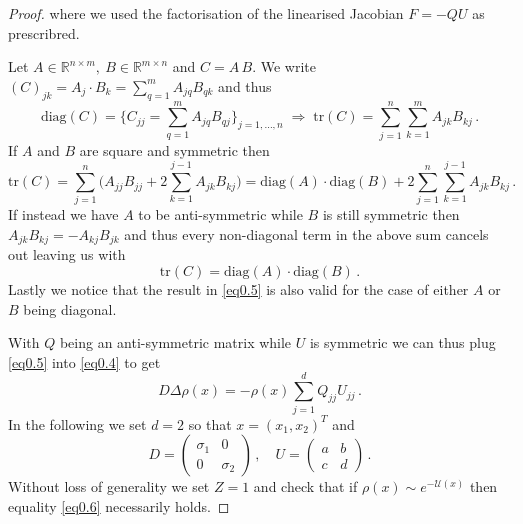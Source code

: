 \documentclass[../main.tex]{subfiles}
\begin{document}
\begin{proof}
          where we used the factorisation of the linearised Jacobian $F=-QU$ as prescribred.
     \begin{interpretation*}{}
          Let $A\in \mathbb{R}^{n\times m},\:B\in \mathbb{R}^{m\times n}$ and $C=A\,B$. We write $(C)_{jk}=A_{j}\cdot B_{k}=\sum_{q=1}^{m}A_{jq}B_{qk}$ and thus
          \begin{equation*}
                  \text{diag}(C)=\{C_{jj}=\sum_{q=1}^{m}A_{jq}B_{qj}\}_{j=1,\dots,n}\;\Rightarrow\;\text{tr}(C)=\sum_{j=1}^{n}\sum_{k=1}^{m}A_{jk}B_{kj}\,.
          \end{equation*}
          If $A$ and $B$ are square and symmetric then 
          \begin{equation*}
               \text{tr}(C)=\sum_{j=1}^{n}\bigg(A_{jj}B_{jj}+2 \sum_{k=1}^{j-1}A_{jk}B_{kj}\bigg)=\text{diag}(A)\cdot \text{diag}(B) + 2 \sum_{j=1}^{n}\sum_{k=1}^{j-1}A_{jk}B_{kj}\,.
          \end{equation*}
          If instead we have $A$ to be anti-symmetric while $B$ is still symmetric then $A_{jk}B_{kj}=-A_{kj}B_{jk}$ and thus every non-diagonal term in the above sum cancels out leaving us with
          \begin{equation}\label{eq0.5}
               \text{tr}(C)=\text{diag}(A)\cdot \text{diag}(B)\,.
          \end{equation}
          Lastly we notice that the result in \eqref{eq0.5} is also valid for the case of either $A$ or $B$ being diagonal.
     \end{interpretation*}
     With $Q$ being an anti-symmetric matrix while $U$ is symmetric we can thus plug \eqref{eq0.5} into \eqref{eq0.4} to get
     \color{red}
     \begin{equation}\label{eq0.6}
          D\Delta \rho(x) = -\rho(x)\sum_{j=1}^{d}Q_{jj}U_{jj}\,.
     \end{equation}
     In the following we set $d=2$ so that $x=(x_{1},x_{2})^{T}$ and 
     \begin{equation*}
          D = \begin{pmatrix}
                  \sigma_{1} & 0 \\
                  0 & \sigma_{2}
          \end{pmatrix}\,,\quad U = \begin{pmatrix}
                  a & b \\
                  c & d
          \end{pmatrix}\,.
     \end{equation*}
     Without loss of generality we set $Z = 1$ and check that if $\rho(x)\sim e^{-\mathcal{U}(x)}$ then equality \eqref{eq0.6} necessarily holds. 

\end{proof}
\end{document}
